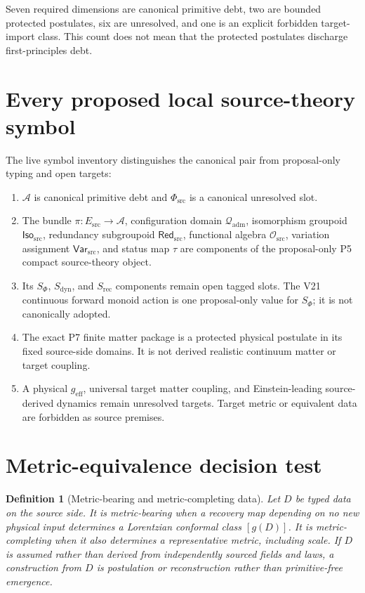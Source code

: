 \documentclass[11pt]{article}
\newcommand{\A}{\mathcal A}
\newcommand{\PhiSrc}{\Phi_{\mathrm{src}}}
\newcommand{\Qadm}{\mathcal Q_{\mathrm{adm}}}
\newcommand{\Isosrc}{\mathsf{Iso}_{\mathrm{src}}}
\newcommand{\Redsrc}{\mathsf{Red}_{\mathrm{src}}}
\newcommand{\Osrc}{\mathcal O_{\mathrm{src}}}
\newcommand{\Varsrc}{\mathsf{Var}_{\mathrm{src}}}
\newtheorem{definition}{Definition}
\begin{document}
\normalsize

Seven required dimensions are canonical primitive debt, two are bounded
protected postulates, six are unresolved, and one is an explicit forbidden
target-import class. This count does not mean that the protected postulates
discharge first-principles debt.

\section{Every proposed local source-theory symbol}

The live symbol inventory distinguishes the canonical pair from proposal-only
typing and open targets:
\begin{enumerate}[label=(\roman*)]
  \item \(\A\) is canonical primitive debt and \(\PhiSrc\) is a canonical
  unresolved slot.
  \item The bundle \(\pi:E_{\mathrm{src}}\to\A\), configuration domain
  \(\Qadm\), isomorphism groupoid \(\Isosrc\), redundancy subgroupoid
  \(\Redsrc\), functional algebra \(\Osrc\), variation assignment
  \(\Varsrc\), and status map \(\tau\) are components of the proposal-only
  P5 compact source-theory object.
  \item Its \(S_{\Phi}\), \(S_{\mathrm{dyn}}\), and
  \(S_{\mathrm{rec}}\) components remain open tagged slots. The V21
  continuous forward monoid action is one proposal-only value for
  \(S_{\Phi}\); it is not canonically adopted.
  \item The exact P7 finite matter package is a protected physical postulate
  in its fixed source-side domains. It is not derived realistic continuum
  matter or target coupling.
  \item A physical \(g_{\mathrm{eff}}\), universal target matter coupling,
  and Einstein-leading source-derived dynamics remain unresolved targets.
  Target metric or equivalent data are forbidden as source premises.
\end{enumerate}

\section{Metric-equivalence decision test}

\begin{definition}[Metric-bearing and metric-completing data]
Let \(D\) be typed data on the source side. It is \emph{metric-bearing} when
a recovery map depending on no new physical input determines a Lorentzian
conformal class \([g(D)]\). It is \emph{metric-completing} when it also
determines a representative metric, including scale. If \(D\) is assumed
rather than derived from independently sourced fields and laws, a construction
from \(D\) is postulation or reconstruction rather than primitive-free
emergence.
\end{definition}
\end{document}
